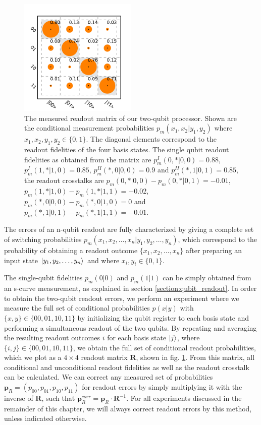 \begin{figure}
	\centering
	\includegraphics[width=0.5\textwidth]{"./data/ct5/2011_04_21 - grover and tomo/good_data/readout_matrix_no_shelving"}
	\caption{The measured readout matrix of our two-qubit processor. Shown are the conditional measurement probabilities $p_m(x_1,x_2|y_1,y_2)$ where $x_1,x_2,y_1,y_2\in\{0,1\}$. The diagonal elements correspond to the readout fidelities of the four basis states. The single qubit readout fidelities as obtained from the matrix are $p_m^I(0,*|0,0)=0.88$, $p_m^I(1,*|1,0)=0.85$, $p_m^{II}(*,0|0,0)=0.9$ and $p_m^{II}(*,1|0,1)=0.85$, the readout crosstalks are $p_m(0,*|0,0) - p_m(0,*|0,1)=-0.01$, $p_m(1,*|1,0) - p_m(1,*|1,1)=-0.02$, $p_m(*,0|0,0) - p_m(*,0|1,0)=0$ and $p_m(*,1|0,1) - p_m(*,1|1,1)=-0.01$.}
	\label{fig:readout_matrix_no_shelving}
\end{figure}

The errors of an n-qubit readout are fully characterized by giving a complete set of switching probabilities $p_m(x_1,x_2,\hdots,x_n|y_1,y_2,\hdots,y_n)$, which correspond to the probability of obtaining a readout outcome $\{x_1,x_2,\hdots,x_n\}$ after preparing an input state $\left| y_1,y_2,\hdots,y_n \right>$ and where $x_i,y_i\in \{0,1\}$. 

\smallskip

The single-qubit fidelities $p_m(0|0)$ and $p_m(1|1)$ can be simply obtained from an s-curve measurement, as explained in section \ref{section:qubit_readout}. In order to obtain the two-qubit readout errors, we perform an experiment where we measure the full set of conditional probabilities $p(x|y)$ with $\{x,y\}\in\{00,01,10,11\}$ by initializing the qubit register to each basis state and performing a simultaneous readout of the two qubits. By repeating and averaging the resulting readout outcomes $i$ for each basis state $\left| j \right>$, where $\{i,j\}\in\{00,01,10,11\}$, we obtain the full set of conditional readout probabilities, which we plot as a $4\times 4$ readout matrix $\mathbf{R}$, shown in fig. \ref{fig:readout_matrix_no_shelving}. From this matrix, all conditional and unconditional readout fidelities as well as the readout crosstalk can be calculated. We can correct any measured set of probabilities $\mathbf{p}_R=(p_{00},p_{01},p_{10},p_{11})$ for readout errors by simply multiplying it with the inverse of $\mathbf{R}$, such that $\mathbf{p}_R^{corr}=\mathbf{p}_R\cdot \mathbf{R}^{-1}$. For all experiments discussed in the remainder of this chapter, we will always correct readout errors by this method, unless indicated otherwise.

